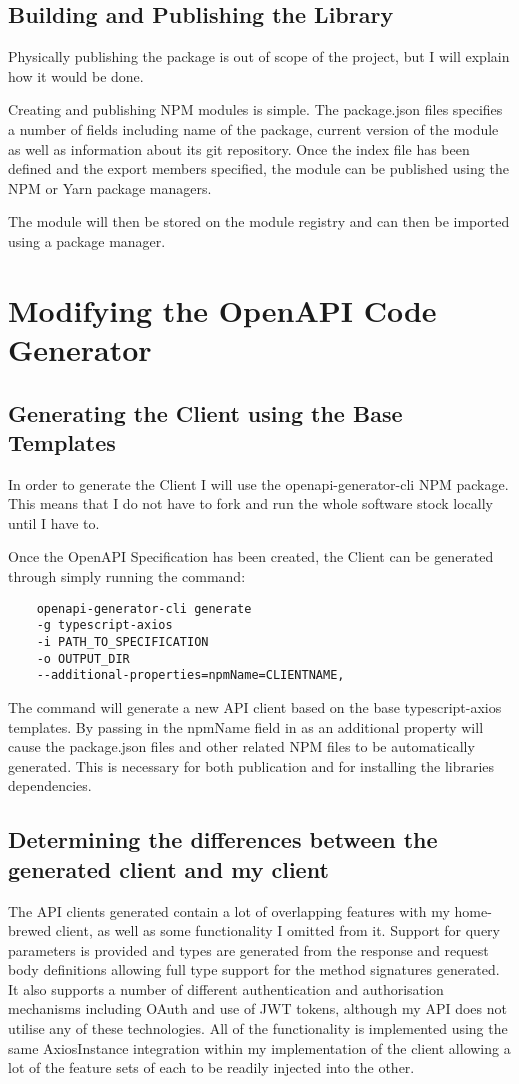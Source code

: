 \subsection{Building and Publishing the Library}
    Physically publishing the package is out of scope of the project, but I will explain how it would be done.

    Creating and publishing NPM modules is simple. The package.json files specifies a number of fields including name of the package, current version of the module as well as information about its git repository. Once the index file has been defined and the export members specified, the module can be published using the NPM or Yarn package managers.
    
    The module will then be stored on the module registry and can then be imported using a package manager. 
    
\section{Modifying the OpenAPI Code Generator}
\subsection{Generating the Client using the Base Templates}
In order to generate the Client I will use the openapi-generator-cli NPM package. This means that I do not have to fork and run the whole software stock locally until I have to.

Once the OpenAPI Specification has been created, the Client can be generated through simply running the command:
\begin{verbatim}
    openapi-generator-cli generate 
    -g typescript-axios 
    -i PATH_TO_SPECIFICATION
    -o OUTPUT_DIR
    --additional-properties=npmName=CLIENTNAME,
\end{verbatim}
The command will generate a new API client based on the base typescript-axios templates. By passing in the npmName field in as an additional property will cause the package.json files and other related NPM files to be automatically generated. This is necessary for both publication and for installing the libraries dependencies.
\subsection{Determining the differences between the generated client and my client}
The API clients generated contain a lot of overlapping features with my home-brewed client, as well as some functionality I omitted from it. Support for query parameters is provided and types are generated from the response and request body definitions allowing full type support for the method signatures generated. It also supports a number of different authentication and authorisation mechanisms including OAuth and use of JWT tokens, although my API does not utilise any of these technologies. All of the functionality is implemented using the same AxiosInstance integration within my implementation of the client allowing a lot of the feature sets of each to be readily injected into the other. 


